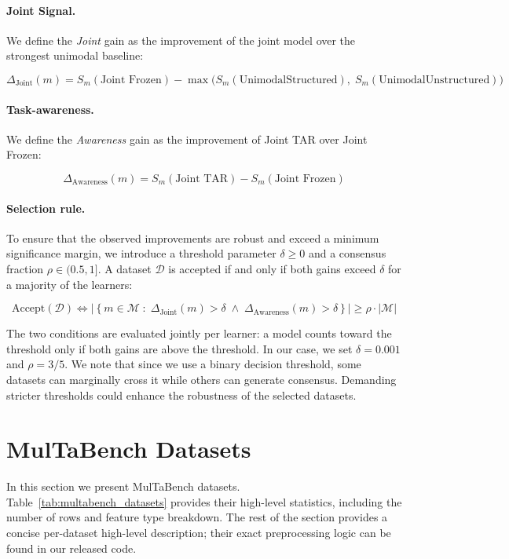 \paragraph{Joint Signal.} We define the \textit{Joint} gain as the improvement of the joint model over the strongest unimodal baseline:

$$ \Delta_{\text{Joint}}(m) = S_m(\text{Joint Frozen}) - \max\big(S_m(\text{UnimodalStructured}),\; S_m(\text{UnimodalUnstructured})\big) $$

\paragraph{Task-awareness.} We define the \textit{Awareness} gain as the improvement of Joint TAR over Joint Frozen:

$$ \Delta_{\text{Awareness}}(m) = S_m(\text{Joint TAR}) - S_m(\text{Joint Frozen}) $$

\paragraph{Selection rule.} To ensure that the observed improvements are robust and exceed a minimum significance margin, we introduce a threshold parameter $\delta \geq 0$ and a consensus fraction $\rho \in (0.5, 1]$. A dataset $\mathcal{D}$ is accepted if and only if both gains exceed $\delta$ for a majority of the learners:


$$ \text{Accept}(\mathcal{D}) \iff \left|\left\{ m \in \mathcal{M} \;:\; \Delta_{\text{Joint}}(m) > \delta \;\land\; \Delta_{\text{Awareness}}(m) > \delta \right\}\right| \geq \rho \cdot |\mathcal{M}| $$

The two conditions are evaluated jointly per learner: a model counts toward the threshold only if both gains are above the threshold. In our case, we set $\delta=0.001$ and $\rho=3/5$. We note that since we use a binary decision threshold, some datasets can marginally cross it while others can generate consensus. Demanding stricter thresholds could enhance the robustness of the selected datasets.


\section{MulTaBench Datasets}
\label{app:multabench}

In this section we present MulTaBench datasets. Table~\ref{tab:multabench_datasets} provides their high-level statistics, including the number of rows and feature type breakdown. The rest of the section provides a concise per-dataset high-level description; their exact preprocessing logic can be found in our released code.

